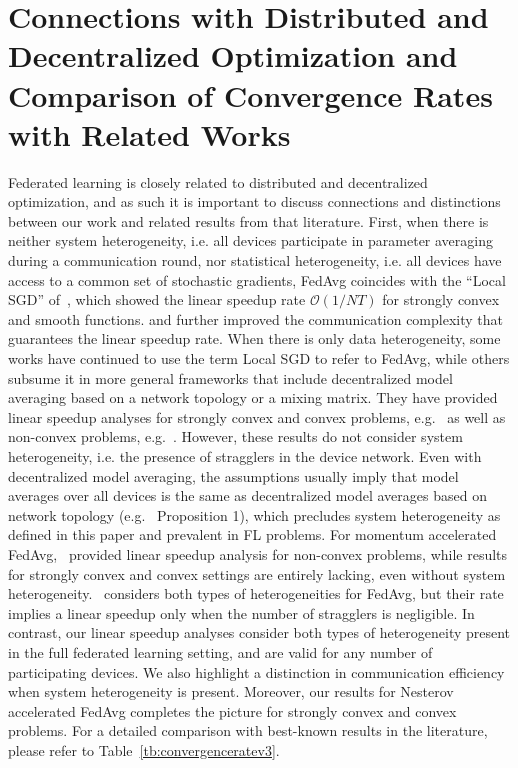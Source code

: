 

\section{Connections with Distributed and Decentralized Optimization and Comparison of Convergence Rates with Related Works}
\label{sec:app:comparison}
Federated learning is closely related to distributed and decentralized optimization, and as such it is important to discuss connections and distinctions between our work and related results from that literature. First, when there is neither system heterogeneity, i.e. all devices participate in parameter averaging during a communication round, nor statistical heterogeneity, i.e. all devices have access to a common set of stochastic gradients, FedAvg coincides with the ``Local SGD'' of~\cite{stich2018local}, which showed the linear speedup rate $\mathcal{O}(1/NT)$ for strongly convex and smooth functions. \cite{woodworth2020local} and \cite{woodworth2020minibatch} further improved the communication complexity that guarantees the linear speedup rate. When there is only data heterogeneity, some works have continued to use the term Local SGD to refer to FedAvg, while others subsume it in more general frameworks that include decentralized model averaging based on a network topology or a mixing matrix. They have provided linear speedup analyses for strongly convex and convex problems, e.g.~\cite{khaled2020tighter,koloskova2020unified} as well as non-convex problems, e.g.~\cite{jiang2018linear,yu2019parallel,wang2018cooperative}. However, these results do not consider system heterogeneity, i.e. the presence of stragglers in the device network. Even with decentralized model averaging, the assumptions usually imply that model averages over all devices is the same as decentralized model averages based on network topology (e.g.~\cite{koloskova2020unified} Proposition 1), which precludes system heterogeneity as defined in this paper and prevalent in FL problems. For momentum accelerated FedAvg,~\cite{yu2019linear} provided linear speedup analysis for non-convex problems, while results for strongly convex and convex settings are entirely lacking, even without system heterogeneity.~\cite{karimireddy2019scaffold} considers both types of heterogeneities for FedAvg, but their rate implies a linear speedup only when the number of stragglers is negligible. In contrast, our linear speedup analyses consider both types of heterogeneity present in the full federated learning setting, and are valid for any number of participating devices. We also highlight a distinction in communication efficiency when system heterogeneity is present. Moreover, our results for Nesterov accelerated FedAvg completes the picture for strongly convex and convex problems. For a detailed comparison with best-known results in the literature, please refer to Table~\ref{tb:convergenceratev3}.

